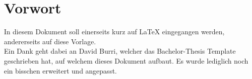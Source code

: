\chapter*{Vorwort}
\label{chap:vorwort}

In diesem Dokument soll einerseits kurz auf \LaTeX{} eingegangen werden, andererseits auf diese Vorlage.\\
Ein Dank geht dabei an David Burri, welcher das Bachelor-Thesis Template geschrieben hat, auf welchem dieses Dokument aufbaut. Es wurde lediglich noch ein bisschen erweitert und angepasst.
